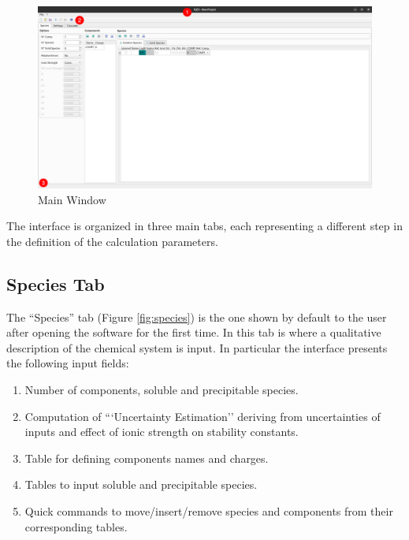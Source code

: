 \documentclass[a4paper, 12pt]{article}
\newcommand*\circled[1]{\kern-2.5em%
  \put(0,4){\color{red}\circle*{18}}\put(0,4){\circle{16}}%
  \put(-4,0){\color{white}\bfseries\large#1}~~}
\begin{document}
\begin{figure}[h]
	\centering
	\includegraphics[width=\textwidth]{img/main.png}
	\caption{Main Window}
    \label{fig:main}
\end{figure}

The interface is organized in three main tabs, each representing a different step in the definition of the calculation parameters.

\subsection{Species Tab}
The ``Species'' tab (Figure \ref*{fig:species}) is the one shown by default to the user after opening the software for the first time.
In this tab is where a qualitative description of the chemical system is input.
In particular the interface presents the following input fields:

\begin{enumerate}[label=\protect\circled{\arabic*}]
    \item Number of components, soluble and precipitable species.
    \item Computation of ```Uncertainty Estimation'' deriving from uncertainties of inputs and effect of ionic strength on stability constants.
    \item Table for defining components names and charges.
    \item Tables to input soluble and precipitable species.
    \item Quick commands to move/insert/remove species and components from their corresponding tables.
\end{enumerate}
\end{document}
